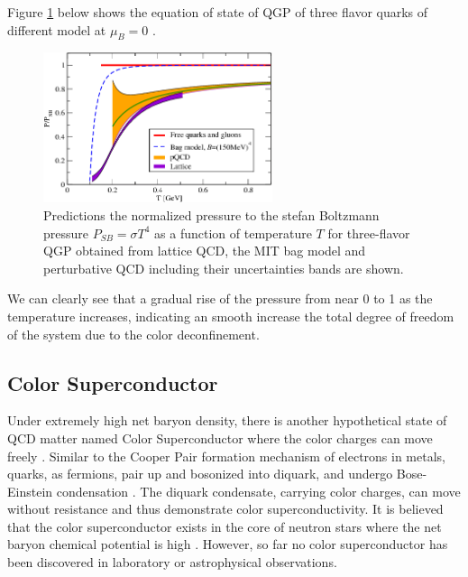 Figure \ref{QGPEOS} below shows the equation of state of QGP of three flavor quarks of different model at $\mu_B = 0$ \cite{QGPEOSRef}. 


\begin{figure}[hbtp]
\begin{center}
\includegraphics[width=0.60\textwidth]{Figures/Chapter1/QGPEOS.png}
\caption{Predictions the normalized pressure to the stefan Boltzmann pressure $P_{SB} = \sigma T^4$ as a function of temperature $T$ for three-flavor QGP obtained from lattice QCD, the MIT bag model and perturbative QCD including their uncertainties bands are shown.}
\label{QGPEOS}
\end{center}
\end{figure} 

We can clearly see that a gradual rise of the pressure from near 0 to 1 as the temperature increases, indicating an smooth increase the total degree of freedom of the system due to the color deconfinement. 


\subsection{Color Superconductor}

Under extremely high net baryon density, there is another hypothetical state of QCD matter named Color Superconductor where the color charges can move freely \cite{ColorSuperconductor}. Similar to the Cooper Pair formation mechanism of electrons in metals, quarks, as fermions, pair up and bosonized into diquark, and undergo Bose-Einstein condensation \cite{ColorSuperconductor}. The diquark condensate, carrying color charges, can move without resistance and thus demonstrate color superconductivity. It is believed that the color superconductor exists in the core of neutron stars where the net baryon chemical potential is high \cite{CSCOccurrence}. However, so far no color superconductor has been discovered in laboratory or astrophysical observations. 


